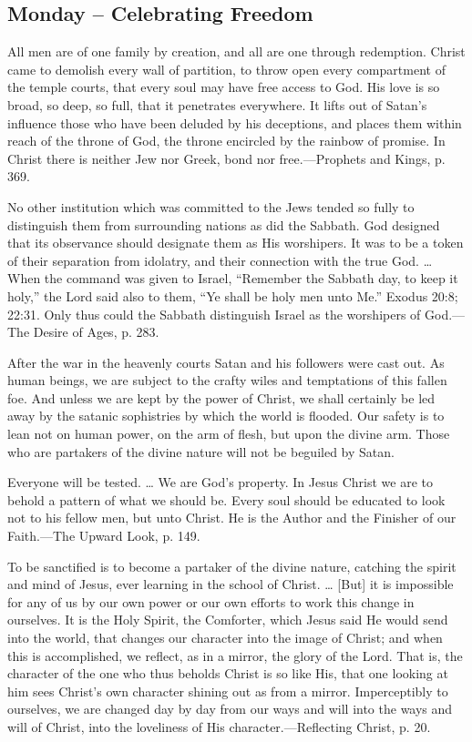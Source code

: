 \documentclass[a4paper, 10pt, twoside, headings=small]{scrartcl}
\begin{document}
\begin{multicols}{2}
\section*{Monday – Celebrating Freedom}

All men are of one family by creation, and all are one through redemption. Christ came to demolish every wall of partition, to throw open every compartment of the temple courts, that every soul may have free access to God. His love is so broad, so deep, so full, that it penetrates everywhere. It lifts out of Satan’s influence those who have been deluded by his deceptions, and places them within reach of the throne of God, the throne encircled by the rainbow of promise. In Christ there is neither Jew nor Greek, bond nor free.—Prophets and Kings, p. 369.

No other institution which was committed to the Jews tended so fully to distinguish them from surrounding nations as did the Sabbath. God designed that its observance should designate them as His worshipers. It was to be a token of their separation from idolatry, and their connection with the true God. … When the command was given to Israel, “Remember the Sabbath day, to keep it holy,” the Lord said also to them, “Ye shall be holy men unto Me.” Exodus 20:8; 22:31. Only thus could the Sabbath distinguish Israel as the worshipers of God.—The Desire of Ages, p. 283.

After the war in the heavenly courts Satan and his followers were cast out. As human beings, we are subject to the crafty wiles and temptations of this fallen foe. And unless we are kept by the power of Christ, we shall certainly be led away by the satanic sophistries by which the world is flooded. Our safety is to lean not on human power, on the arm of flesh, but upon the divine arm. Those who are partakers of the divine nature will not be beguiled by Satan.

Everyone will be tested. … We are God’s property. In Jesus Christ we are to behold a pattern of what we should be. Every soul should be educated to look not to his fellow men, but unto Christ. He is the Author and the Finisher of our Faith.—The Upward Look, p. 149.

To be sanctified is to become a partaker of the divine nature, catching the spirit and mind of Jesus, ever learning in the school of Christ. … [But] it is impossible for any of us by our own power or our own efforts to work this change in ourselves. It is the Holy Spirit, the Comforter, which Jesus said He would send into the world, that changes our character into the image of Christ; and when this is accomplished, we reflect, as in a mirror, the glory of the Lord. That is, the character of the one who thus beholds Christ is so like His, that one looking at him sees Christ’s own character shining out as from a mirror. Imperceptibly to ourselves, we are changed day by day from our ways and will into the ways and will of Christ, into the loveliness of His character.—Reflecting Christ, p. 20.


\end{multicols}
\end{document}
